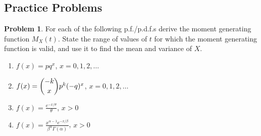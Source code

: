 \documentclass[12pt,a4paper]{report}
\theoremstyle{definition}
\theoremstyle{plain}
\theoremstyle{definition}
\newtheorem{problemx}{Problem}[section]
\newenvironment{problem}{\begin{problemx}}{\end{problemx}}
\begin{document}
\subsection{Practice Problems}

\begin{problem}
For each of the following p.f./p.d.f.s derive the moment generating function $M_X(t)$.
State the range of values of $t$ for which the moment generating function is valid, and
use it to find the mean and variance of $X$.
\begin{enumerate}
\item[(a).] $f(x) = pq^{x}$, \quad $x = 0,1,2,\ldots$
\item[(b).] $f(x) = \dbinom{-k}{x}p^{k}(-q)^{x}$, \quad $x = 0,1,2,\ldots$
\item[(c).] $f(x) = \frac{e^{-x/\theta}}{\theta}$, \quad $x>0$
\item[(d).] $f(x) = \frac{x^{\alpha-1}e^{-x/\beta}}{\beta^{\alpha}\Gamma(\alpha)}$,
 \quad $x>0$
\end{enumerate}
\end{problem}
\end{document}
